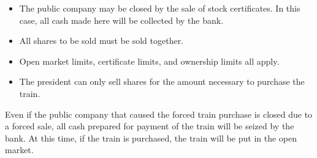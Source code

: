 \documentclass{article}
\begin{document}
\begin{CJK}{UTF8}{min}
\begin{multicols}{2}
\begin{itemize}
\item The public company may be closed by the sale of stock
  certificates. In this case, all cash made here will be collected by
  the bank.

\item All shares to be sold must be sold together.

\item Open market limits, certificate limits, and ownership limits all apply.

\item The president can only sell shares for the amount necessary to
  purchase the train.
\end{itemize}

Even if the public company that caused the forced train purchase is closed
due to a forced sale, all cash prepared for payment of the train will
be seized by the bank. At this time, if the train is purchased, the
train will be put in the open market.
\end{multicols}

\renewcommand*{\thesection}{\Roman{section}}
\renewcommand*{\theHsection}{appendix.\Alph{section}}
\setcounter{section}{0}





\end{CJK}
\end{document}
